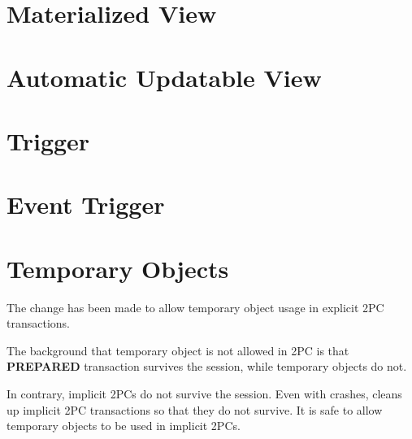 



\section{\label{sec:mview}Materialized View}





\section{\label{sec:updatableView}Automatic Updatable View}





\section{\label{sec:trigger}Trigger}





\section{\label{sec:eventTrigger}Event Trigger}





\section{\label{sec:tempObject}Temporary Objects}

  The change has been made to allow temporary object usage in explicit 2PC transactions.
  
  The background that temporary object is not allowed in 2PC is that \textbf{PREPARED} transaction survives
  the session, while temporary objects do not.
  
  In contrary, implicit 2PCs do not survive the session.
  Even with crashes,  cleans up implicit 2PC transactions so that they do not
  survive.
  It is safe to allow temporary objects to be used in implicit 2PCs.
  

